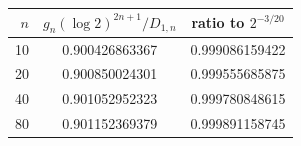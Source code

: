 \begin{tabular}{rcc}
\toprule
$n$ & $g_n(\log 2)^{2n+1}/D_{1,n}$ & ratio to $2^{-3/20}$ \\
\midrule
10 & 0.900426863367 & 0.999086159422 \\
20 & 0.900850024301 & 0.999555685875 \\
40 & 0.901052952323 & 0.999780848615 \\
80 & 0.901152369379 & 0.999891158745 \\
\bottomrule
\end{tabular}
